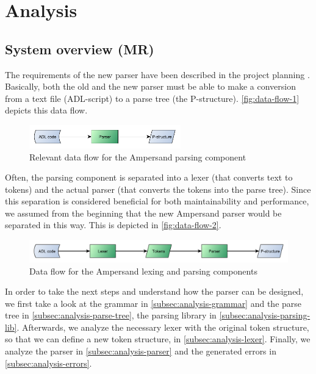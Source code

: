 
\section{Analysis}
\label{sec:analysis}

\subsection{System overview (MR)}
The requirements of the new parser have been described in the project planning .
Basically, both the old and the new parser must be able to make a conversion from a text file (ADL-script) to a parse tree (the P-structure).
\autoref{fig:data-flow-1} depicts this data flow.
%
\begin{figure}[htb!]
	\centering
	\includegraphics[width=0.586\textwidth]{Figures/DataFlow1}
	\caption{Relevant data flow for the Ampersand parsing component}
	\label{fig:data-flow-1}
\end{figure}

Often, the parsing component is separated into a lexer (that converts text to tokens) and the actual parser (that converts the tokens into the parse tree).
Since this separation is considered beneficial for both maintainability and performance, we assumed from the beginning that the new Ampersand parser would be separated in this way.
This is depicted in \autoref{fig:data-flow-2}.
%
\begin{figure}[htb!]
	\centering
	\includegraphics[width=1\textwidth]{Figures/DataFlow2}
	\caption{Data flow for the Ampersand lexing and parsing components}
	\label{fig:data-flow-2}
\end{figure}

In order to take the next steps and understand how the parser can be designed, we first take a look at the grammar in \autoref{subsec:analysis-grammar} and the parse tree in \autoref{subsec:analysis-parse-tree}, the parsing library in \autoref{subsec:analysis-parsing-lib}.
Afterwards, we analyze the necessary lexer with the original token structure, so that we can define a new token structure, in \autoref{subsec:analysis-lexer}.
Finally, we analyze the parser in \autoref{subsec:analysis-parser} and the generated errors in \autoref{subsec:analysis-errors}.

